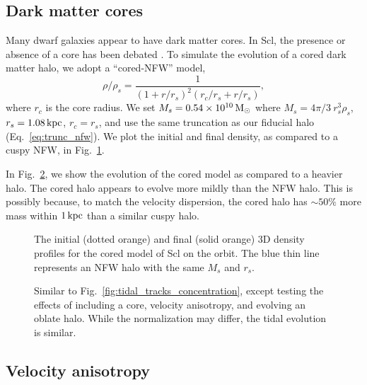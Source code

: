 \subsection{Dark matter cores}\label{dark-matter-cores}

Many dwarf galaxies appear to have dark matter cores. In Scl, the
presence or absence of a core has been debated
\citep[e.g.,][]{battaglia+2008, walker+2009a, agnello+evans2012, breddels+helmi2013, amorisco+zavala+deboer2014, richardson+fairbairn2014}.
To simulate the evolution of a cored dark matter halo, we adopt a
``cored-NFW'' model, \begin{equation}{
\rho/\rho   _s = \frac{1}{(1+r/r_s)^2 (r_c/r_s + r/r_s)},
}\end{equation} where \(r_c\) is the core radius. We set
\(M_s=0.54\times10^{10}\,{\rm M}_{\odot}\) where \(M_s = 4\pi/3\ r_s^3 \rho_s\),
\(r_s=1.08\,{\rm kpc}\), \(r_c=r_s\), and use the same truncation as our
fiducial halo (Eq.~\ref{eq:trunc_nfw}). We plot the initial and final
density, as compared to a cuspy NFW, in Fig.~\ref{fig:cored_i_f}.

In Fig.~\ref{fig:tidal_tracks_structure}, we show the evolution of the
cored model as compared to a heavier halo. The cored halo appears to
evolve more mildly than the NFW halo. This is possibly because, to match
the velocity dispersion, the cored halo has \(\sim 50\%\) more mass
within \(1\,{\rm kpc}\) than a similar cuspy halo.

\begin{figure}
\centering
{}
\caption[Tidal evolution of a cored density profile]{The initial (dotted
orange) and final (solid orange) 3D density profiles for the cored model
of Scl on the \smallperi{} orbit. The blue thin line represents an NFW
halo with the same \(M_s\) and \(r_s\).}\label{fig:cored_i_f}
\end{figure}

\begin{figure}
\centering
{}
\caption[Tidal tracks depending on halo substructure]{Similar to
Fig.~\ref{fig:tidal_tracks_concentration}, except testing the effects of
including a core, velocity anisotropy, and evolving an oblate halo.
While the normalization may differ, the tidal evolution is
similar.}\label{fig:tidal_tracks_structure}
\end{figure}

\subsection{Velocity anisotropy}\label{velocity-anisotropy}

